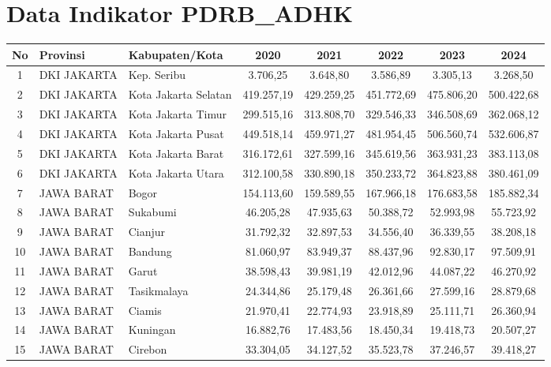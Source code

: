 \section*{Data Indikator PDRB\_ADHK}
\begin{spacing}{1.0}
\scriptsize
\setlength{\tabcolsep}{2pt}
\begin{longtable}{|c|p{2.2cm}|p{2.8cm}|c|c|c|c|c|}
\hline
\textbf{No} & \textbf{Provinsi} & \textbf{Kabupaten/Kota} & \textbf{2020} & \textbf{2021} & \textbf{2022} & \textbf{2023} & \textbf{2024} \\ \hline
\endhead
1 & DKI JAKARTA & Kep. Seribu & 3.706,25 & 3.648,80 & 3.586,89 & 3.305,13 & 3.268,50 \\ \hline
2 & DKI JAKARTA & Kota Jakarta Selatan & 419.257,19 & 429.259,25 & 451.772,69 & 475.806,20 & 500.422,68 \\ \hline
3 & DKI JAKARTA & Kota Jakarta Timur & 299.515,16 & 313.808,70 & 329.546,33 & 346.508,69 & 362.068,12 \\ \hline
4 & DKI JAKARTA & Kota Jakarta Pusat & 449.518,14 & 459.971,27 & 481.954,45 & 506.560,74 & 532.606,87 \\ \hline
5 & DKI JAKARTA & Kota Jakarta Barat & 316.172,61 & 327.599,16 & 345.619,56 & 363.931,23 & 383.113,08 \\ \hline
6 & DKI JAKARTA & Kota Jakarta Utara & 312.100,58 & 330.890,18 & 350.233,72 & 364.823,88 & 380.461,09 \\ \hline
7 & JAWA BARAT & Bogor & 154.113,60 & 159.589,55 & 167.966,18 & 176.683,58 & 185.882,34 \\ \hline
8 & JAWA BARAT & Sukabumi & 46.205,28 & 47.935,63 & 50.388,72 & 52.993,98 & 55.723,92 \\ \hline
9 & JAWA BARAT & Cianjur & 31.792,32 & 32.897,53 & 34.556,40 & 36.339,55 & 38.208,18 \\ \hline
10 & JAWA BARAT & Bandung & 81.060,97 & 83.949,37 & 88.437,96 & 92.830,17 & 97.509,91 \\ \hline
11 & JAWA BARAT & Garut & 38.598,43 & 39.981,19 & 42.012,96 & 44.087,22 & 46.270,92 \\ \hline
12 & JAWA BARAT & Tasikmalaya & 24.344,86 & 25.179,48 & 26.361,66 & 27.599,16 & 28.879,68 \\ \hline
13 & JAWA BARAT & Ciamis & 21.970,41 & 22.774,93 & 23.918,89 & 25.111,71 & 26.360,94 \\ \hline
14 & JAWA BARAT & Kuningan & 16.882,76 & 17.483,56 & 18.450,34 & 19.418,73 & 20.507,27 \\ \hline
15 & JAWA BARAT & Cirebon & 33.304,05 & 34.127,52 & 35.523,78 & 37.246,57 & 39.418,27 \\ \hline

\end{longtable}
\end{spacing}
